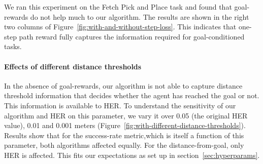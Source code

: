 We ran this experiment on the Fetch Pick and Place task and found that goal-rewards
do not help much to our algorithm. The results are shown in the right two columns
of Figure~\ref{fig:with-and-without-step-loss}. This indicates that one-step path reward
fully captures the information required for goal-conditioned tasks.

\paragraph{Effects of different distance thresholds}

In the absence of goal-rewards, our algorithm is not able to capture distance
threshold information that decides whether the agent has reached the goal or
not. This information is available to HER. To understand the
sensitivity of our algorithm and HER on this parameter, we vary it over
0.05 (the original HER value), 0.01 and 0.001 meters
(Figure~\ref{fig:with-different-distance-thresholds}). Results show that
for the success-rate metric,which is itself a function of this
parameter, both algorithms affected equally. For the distance-from-goal,
only HER is affected. This fits our expectations as set up in 
section~\ref{sec:hyperparams}.



